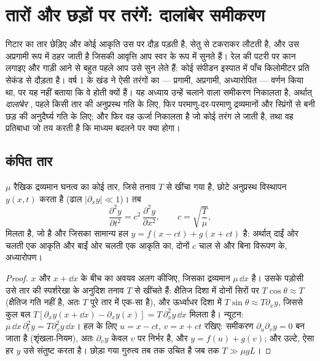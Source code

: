 \chapter{तारों और छड़ों पर तरंगें: दालांबेर समीकरण}\label{ch:b2:waves-on-strings}

गिटार का तार छेड़िए और कोई आकृति उस पर दौड़ पड़ती है, सेतु से टकराकर
लौटती है, और उस अप्रगामी रूप में ठहर जाती है जिसकी आवृत्ति आप स्वर के
रूप में सुनते हैं। रेल की पटरी पर कान लगाइए और गाड़ी आने से बहुत पहले
आप उसे सुन लेते हैं: कोई संपीडन इस्पात में पाँच किलोमीटर प्रति सेकंड से
दौड़ता है। वर्ष 1 के खंड ने ऐसी तरंगों का --- प्रगामी, अप्रगामी,
अध्यारोपित --- वर्णन किया था, पर यह नहीं बताया कि वे होती क्यों हैं।
यह अध्याय उन्हें चलाने वाला समीकरण निकालता है, अर्थात्
\emph{दालांबेर }, पहले किसी तार की अनुप्रस्थ गति के लिए,
फिर परमाणु-दर-परमाणु द्रव्यमानों और स्प्रिंगों से बनी छड़ की अनुदैर्घ्य
गति के लिए; और फिर वह ऊर्जा निकालता है जो कोई तरंग ले जाती है, तथा वह
प्रतिबाधा जो तय करती है कि माध्यम बदलने पर क्या होगा।

\section{कंपित तार}

\begin{theorem}[तार का तरंग-समीकरण]\label{thm:b2:waves-on-strings:equation}
$\mu$ रैखिक द्रव्यमान घनत्व का कोई तार, जिसे तनाव $T$ से खींचा गया है,
छोटे अनुप्रस्थ विस्थापन $y(x, t)$ करता है (ढाल $|\partial_xy| \ll 1$)। तब
\[
\frac{\partial^2y}{\partial t^2} = c^2\,\frac{\partial^2y}{\partial x^2} ,
\qquad c = \sqrt{\frac{T}{\mu}} ,
\]
मिलता है, जो \emph{} है और जिसका सामान्य हल $y = f(x - ct)
+ g(x + ct)$ है: अर्थात् दाईं ओर चलती एक आकृति और बाईं ओर चलती एक आकृति
का, दोनों $c$ चाल से और बिना विरूपण के, अध्यारोपण।
\end{theorem}

\begin{proof}
$x$ और $x + \dd x$ के बीच का अवयव अलग कीजिए, जिसका द्रव्यमान $\mu\,\dd x$
है। उसके पड़ोसी उसे तार की स्पर्शरेखा के अनुदिश तनाव $T$ से खींचते हैं:
क्षैतिज दिशा में दोनों सिरों पर $T\cos\theta \approx T$ (क्षैतिज गति नहीं है, अतः
$T$ पूरे तार में एक-सा है), और ऊर्ध्वाधर दिशा में $T\sin\theta \approx T\partial_xy$, जिससे
कुल बल $T[\partial_xy(x + \dd x) - \partial_xy(x)] = T\,\partial_x^2y\,\dd x$ मिलता है।
न्यूटन: $\mu\,\dd x\,\partial_t^2y = T\partial_x^2y\,\dd x$। हल के लिए
$u = x - ct$, $v = x + ct$ रखिए: समीकरण $\partial_u\partial_vy = 0$ बन जाता है
(शृंखला-नियम), अतः $\partial_vy$ केवल $v$ पर निर्भर है, और $y = f(u) + g(v)$;
और उल्टे, ऐसा हर $y$ उसे संतुष्ट करता है। छोड़ा गया गुरुत्व तब तक
उचित है जब तक $T \gg \mu gL$।
\end{proof}

